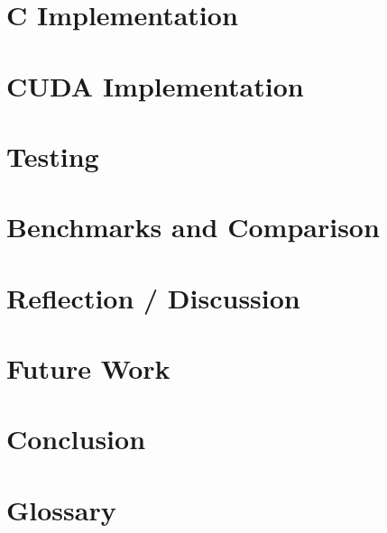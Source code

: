 \documentclass[oribibl]{llncs}
\numberwithin{equation}{section}
\begin{document}
	\section{C Implementation}
	
	\label{implementation}
	
	\section{CUDA Implementation}
	
	\label{realization}
		
	\section{Testing}
	
	\label{testing}
		
	\section{Benchmarks and Comparison}
	
	\label{bandc}
	
	\section{Reflection / Discussion}
	
	\label{reflection}
		
	\section{Future Work}
	
	\label{futurework}
	
	\section{Conclusion}
	
	
	\label{conclusion}
		
	\section{Glossary}
	
	
		
\end{document}
